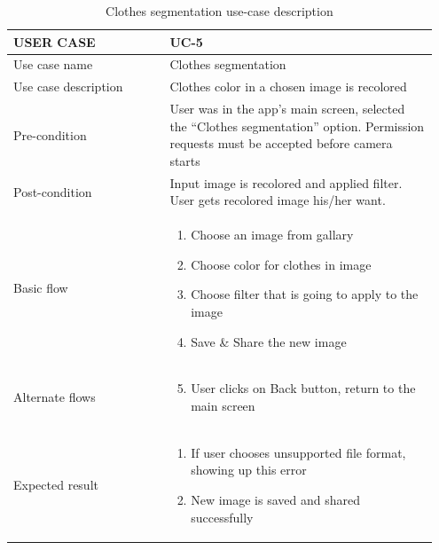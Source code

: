 \begin{center}
\begin{table} [H]
\caption{Clothes segmentation use-case description} 
\begin{tabular}{p{0.35\linewidth} | p{0.6\linewidth}}
\hline
USER CASE            & UC-5 \\ \hline
Use case name        &  Clothes segmentation  \\ \hline
Use case description &  Clothes color in a chosen image is recolored    \\\hline
Pre-condition         &   User was in the app’s main screen, selected the “Clothes segmentation” option. Permission requests must be accepted before camera starts   \\ \hline
Post-condition        &   Input image is recolored and applied filter. User gets recolored image his/her want.   \\ \hline
Basic flow           &   \begin{enumerate}
    \item Choose an image from gallary
\item Choose color for clothes in image
\item Choose filter that is going to apply to the image
\item Save \& Share the new image
\end{enumerate}
   \\ \hline
Alternate flows      &    \begin{enumerate}
    \setcounter{enumi}{4}
    \item User clicks on Back button, return to the main screen
\end{enumerate}  \\ \hline
Expected result      &  \begin{enumerate}
    \item If user chooses unsupported file format, showing up this error
\item New image is saved and shared successfully
\end{enumerate}    \\ \hline
\end{tabular}
\end{table}
\end{center}


